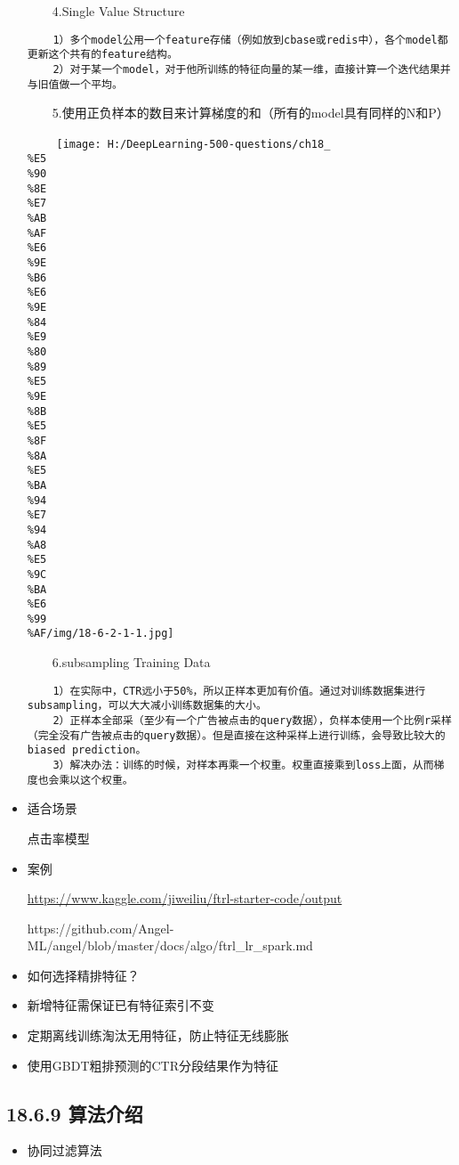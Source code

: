 \begin{itemize}
  　　4.Single Value Structure

\begin{verbatim}
    1）多个model公用一个feature存储（例如放到cbase或redis中），各个model都更新这个共有的feature结构。
    2）对于某一个model，对于他所训练的特征向量的某一维，直接计算一个迭代结果并与旧值做一个平均。
\end{verbatim}

  　　5.使用正负样本的数目来计算梯度的和（所有的model具有同样的N和P）

  　　
  \texttt{[image: H:/DeepLearning-500-questions/ch18\_\\\%E5\\\%90\\\%8E\\\%E7\\\%AB\\\%AF\\\%E6\\\%9E\\\%B6\\\%E6\\\%9E\\\%84\\\%E9\\\%80\\\%89\\\%E5\\\%9E\\\%8B\\\%E5\\\%8F\\\%8A\\\%E5\\\%BA\\\%94\\\%E7\\\%94\\\%A8\\\%E5\\\%9C\\\%BA\\\%E6\\\%99\\\%AF/img/18-6-2-1-1.jpg]}

  　　6.subsampling Training Data

\begin{verbatim}
    1）在实际中，CTR远小于50%，所以正样本更加有价值。通过对训练数据集进行subsampling，可以大大减小训练数据集的大小。
    2）正样本全部采（至少有一个广告被点击的query数据），负样本使用一个比例r采样（完全没有广告被点击的query数据）。但是直接在这种采样上进行训练，会导致比较大的biased prediction。
    3）解决办法：训练的时候，对样本再乘一个权重。权重直接乘到loss上面，从而梯度也会乘以这个权重。
\end{verbatim}
\item
  适合场景

  点击率模型
\item
  案例

  \href{}{https://www.kaggle.com/jiweiliu/ftrl-starter-code/output}

  https://github.com/Angel-ML/angel/blob/master/docs/algo/ftrl\_lr\_spark.md
\item
  如何选择精排特征？
\item
  新增特征需保证已有特征索引不变
\item
  定期离线训练淘汰无用特征，防止特征无线膨胀
\item
  使用GBDT粗排预测的CTR分段结果作为特征
\end{itemize}

\subsection{18.6.9 算法介绍}\label{ux7b97ux6cd5ux4ecbux7ecd}

\begin{itemize}
\item
  协同过滤算法
\end{itemize}

